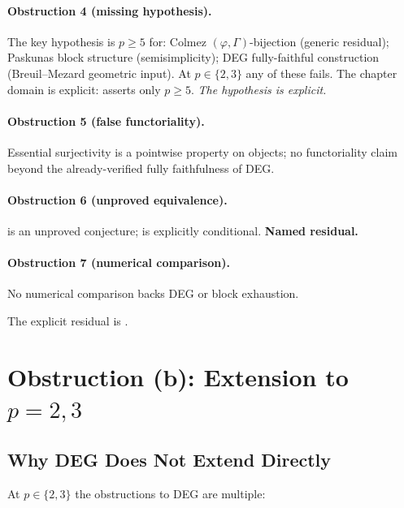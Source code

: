 \paragraph{Obstruction 4 (missing hypothesis).} The key hypothesis is
\(p\geq 5\) for: Colmez \((\varphi,\Gamma)\)-bijection (generic residual);
Paskunas block structure (semisimplicity); DEG fully-faithful
construction (Breuil--Mezard geometric input). At \(p\in\{2,3\}\)
any of these fails. The chapter domain is explicit:
 asserts only
\(p\geq 5\). \emph{The hypothesis is explicit.}

\paragraph{Obstruction 5 (false functoriality).} Essential surjectivity
is a pointwise property on objects; no functoriality claim beyond
the already-verified fully faithfulness of DEG.

\paragraph{Obstruction 6 (unproved equivalence).}
 is an unproved
conjecture;  is
explicitly conditional. \textbf{Named residual.}

\paragraph{Obstruction 7 (numerical comparison).} No numerical comparison backs
DEG or block exhaustion.

The explicit residual is .

\section{Obstruction (b): Extension to \(p=2,3\)}
\label{v4-arith:deg-f1a:wild}

\subsection{Why DEG Does Not Extend Directly}

At \(p\in\{2,3\}\) the obstructions to DEG are multiple:


